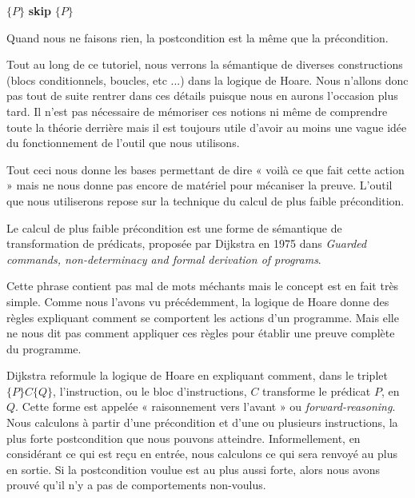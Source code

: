 \begin{center}
$\{P\}$ \textbf{skip} $\{P\}$
\end{center}


Quand nous ne faisons rien, la postcondition est la même que la précondition.



Tout au long de ce tutoriel, nous verrons la sémantique de diverses
constructions (blocs conditionnels, boucles, etc ...) dans la logique de Hoare.
Nous n'allons donc pas tout de suite rentrer dans ces détails puisque nous en
aurons l'occasion plus tard. Il n'est pas nécessaire de mémoriser ces notions
ni même de comprendre toute la théorie derrière mais il est toujours utile
d'avoir au moins une vague idée du fonctionnement de l'outil que nous
utilisons.



Tout ceci nous donne les bases permettant de dire « voilà ce que fait cette
action » mais ne nous donne pas encore de matériel pour mécaniser la preuve.
L'outil que nous utiliserons repose sur la technique du calcul de plus
faible précondition.





Le calcul de plus faible précondition est une forme de sémantique de
transformation de prédicats, proposée par Dijkstra en 1975 dans \textit{Guarded
commands, non-determinacy and formal derivation of programs}.



Cette phrase contient pas mal de mots méchants mais le concept est en fait très
simple. Comme nous l'avons vu précédemment, la logique de Hoare donne des
règles expliquant comment se comportent les actions d'un programme. Mais
elle ne nous dit pas comment appliquer ces règles pour établir une preuve
complète du programme.



Dijkstra reformule la logique de Hoare en expliquant comment, dans le triplet
$\{P\}C\{Q\}$, l'instruction, ou le bloc d'instructions, $C$ transforme le
prédicat $P$, en $Q$. Cette forme est appelée « raisonnement vers l'avant » ou
\textit{forward-reasoning}. Nous calculons à partir d'une précondition et d'une ou
plusieurs instructions, la plus forte postcondition que nous pouvons
atteindre. Informellement, en considérant ce qui est reçu en entrée, nous
calculons ce qui sera renvoyé au plus en sortie. Si la postcondition voulue
est au plus aussi forte, alors nous avons prouvé qu'il n'y a pas de
comportements non-voulus.




